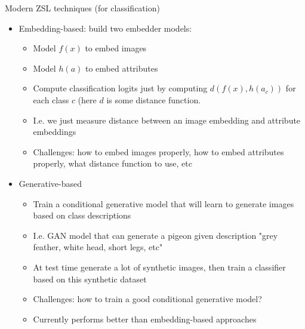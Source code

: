 \documentclass[10pt]{beamer}
\begin{document}
\begin{frame}{Modern ZSL techniques (for classification)}
    \begin{itemize}
        \item\pause Embedding-based: build two embedder models:
        \begin{itemize}
            \item\pause Model $f(x)$ to embed images
            \item\pause Model $h(a)$ to embed attributes
            \item\pause Compute classification logits just by computing $d(f(x), h(a_c))$ for each class $c$ (here $d$ is some distance function.
            \item\pause I.e. we just measure distance between an image embedding and attribute embeddings
            \item\pause Challenges: how to embed images properly, how to embed attributes properly, what distance function to use, etc
        \end{itemize}
        \item\pause Generative-based
        \begin{itemize}
            \item\pause Train a conditional generative model that will learn to generate images based on class descriptions
            \item\pause I.e. GAN model that can generate a pigeon given description "grey feather, white head, short legs, etc"
            \item\pause At test time generate a lot of synthetic images, then train a classifier based on this synthetic dataset
            \item\pause Challenges: how to train a good conditional generative model?
            \item\pause Currently performs better than embedding-based approaches
        \end{itemize}
    \end{itemize}
\end{frame}
\end{document}
